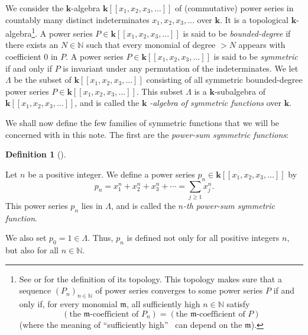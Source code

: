 \documentclass[numbers=enddot,12pt,final,onecolumn,notitlepage]{scrartcl}%
\theoremstyle{definition}
\newtheorem{defi}[theo]{Definition}
\newenvironment{definition}[1][]
{\begin{defi}[#1]\begin{leftbar}}
{\end{leftbar}\end{defi}}
\let\sumnonlimits\sum
\renewcommand{\sum}{\sumnonlimits\limits}
\begin{document}
We consider the $\mathbf{k}$-algebra $\mathbf{k}\left[  \left[  x_{1}%
,x_{2},x_{3},\ldots\right]  \right]  $ of (commutative) power series in
countably many distinct indeterminates $x_{1},x_{2},x_{3},\ldots$ over
$\mathbf{k}$. It is a topological $\mathbf{k}$-algebra\footnote{See
\cite[Section 2.6]{Reiner} or \cite[\S 2]{Grinbe16} for the definition of its
topology. This topology makes sure that a sequence $\left(  P_{n}\right)
_{n\in\mathbb{N}}$ of power series converges to some power series $P$ if and
only if, for every monomial $\mathfrak{m}$, all sufficiently high
$n\in\mathbb{N}$ satisfy%
\[
\left(  \text{the }\mathfrak{m}\text{-coefficient of }P_{n}\right)  =\left(
\text{the }\mathfrak{m}\text{-coefficient of }P\right)
\]
(where the meaning of \textquotedblleft sufficiently high\textquotedblright%
\ can depend on the $\mathfrak{m}$).}. A power series $P\in\mathbf{k}\left[
\left[  x_{1},x_{2},x_{3},\ldots\right]  \right]  $ is said to be
\textit{bounded-degree} if there exists an $N\in\mathbb{N}$ such that every
monomial of degree $>N$ appears with coefficient $0$ in $P$. A power series
$P\in\mathbf{k}\left[  \left[  x_{1},x_{2},x_{3},\ldots\right]  \right]  $ is
said to be \textit{symmetric} if and only if $P$ is invariant under any
permutation of the indeterminates. We let $\Lambda$ be the subset of
$\mathbf{k}\left[  \left[  x_{1},x_{2},x_{3},\ldots\right]  \right]  $
consisting of all symmetric bounded-degree power series $P\in\mathbf{k}\left[
\left[  x_{1},x_{2},x_{3},\ldots\right]  \right]  $. This subset $\Lambda$ is
a $\mathbf{k}$-subalgebra of $\mathbf{k}\left[  \left[  x_{1},x_{2}%
,x_{3},\ldots\right]  \right]  $, and is called the $\mathbf{k}$%
\textit{-algebra of symmetric functions} over $\mathbf{k}$.

We shall now define the few families of symmetric functions that we will be
concerned with in this note. The first are the \textit{power-sum symmetric
functions}:

\begin{definition}
\label{def.powersum}Let $n$ be a positive integer. We define a power series
$p_{n}\in\mathbf{k}\left[  \left[  x_{1},x_{2},x_{3},\ldots\right]  \right]  $
by%
\begin{equation}
p_{n}=x_{1}^{n}+x_{2}^{n}+x_{3}^{n}+\cdots=\sum_{j\geq1}x_{j}^{n}.
\label{eq.def.powersum.pn}%
\end{equation}
This power series $p_{n}$ lies in $\Lambda$, and is called the $n$\textit{-th
power-sum symmetric function}.

We also set $p_{0}=1\in\Lambda$. Thus, $p_{n}$ is defined not only for all
positive integers $n$, but also for all $n\in\mathbb{N}$.
\end{definition}
\end{document}

